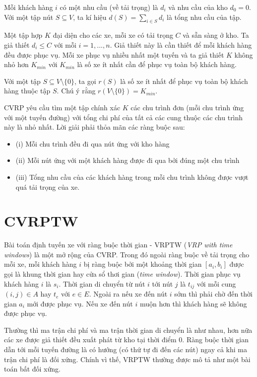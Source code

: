 Mỗi khách hàng $i$ có một nhu cầu (về tải trọng) là $d_i$ và nhu cầu của kho $d_0=0$. Với một tập nút $S \subseteq V$, ta kí hiệu $d(S) = \sum_{i \in S} d_i$ là tổng nhu cầu của tập.

Một tập hợp $K$ đại diện cho các xe, mỗi xe có tải trọng $C$ và sẵn sàng ở kho. Ta giả thiết $d_i \leq C$ với mỗi $i=1,...,n$. Giả thiết này là cần thiết để  mỗi khách hàng đều được phục vụ. Mỗi xe phục vụ nhiều nhất một tuyến và ta giả thiết $K$ không nhỏ hơn $K_{min}$ với $K_{min}$ là số xe ít nhất cần để phục vụ toàn bộ khách hàng. 

Với một tập $S \subseteq V \setminus \{0\}$, ta gọi $r(S)$ là số xe ít nhất để phục vụ toàn bộ khách hàng thuộc tập $S$. Chú ý rằng $r(V \setminus \{0\}) = K_{min}$.

CVRP yêu cầu tìm một tập chính xác $K$ các chu trình đơn (mỗi chu trình ứng với một tuyến đường) với tổng chi phí của tất cả các cung thuộc các chu trình này là nhỏ nhất. Lời giải phải thỏa mãn các ràng buộc sau:
\begin{itemize}
  \item[] (i) Mỗi chu trình đều đi qua nút ứng với kho hàng
  \item[] (ii) Mỗi nút ứng với một khách hàng được đi qua bởi đúng một chu trình 
  \item[] (iii) Tổng nhu cầu của các khách hàng trong mỗi chu trình không được vượt quá tải trọng của xe.
\end{itemize}

\section{CVRPTW}
Bài toán định tuyến xe với ràng buộc thời gian - VRPTW (\textit{VRP with time windows}) là một mở rộng của CVRP. Trong đó ngoài ràng buộc về tải trọng cho mỗi xe, mỗi khách hàng $i$ bị ràng buộc bởi một khoảng thời gian $[a_i, b_i]$ được gọi là khung thời gian hay cửa sổ thơi gian (\textit{time window}). Thời gian phục vụ khách hàng $i$ là $s_i$. Thời gian di chuyển từ nút $i$ tới nút $j$ là $t_{ij}$ với mỗi cung $(i,j) \in A$ hay $t_e$ với $e \in E$. Ngoài ra nếu xe đến nút $i$ sớm thì phải chờ đến thời gian $a_i$ mới được phục vụ. Nếu xe đến nút $i$ muộn hơn thì khách hàng sẽ không được phục vụ.

Thường thì ma trận chi phí và ma trận thời gian di chuyển là như nhau, hơn nữa các xe được giả thiết đều xuất phát từ kho tại thời điểm $0$. Ràng buộc thời gian dẫn tới mỗi tuyến đường là có hướng (có thứ tự đi đến các nút) ngay cả khi ma trận chi phí là đối xứng. Chính vì thế, VRPTW thường được mô tả như một bài toán bất đối xứng.


